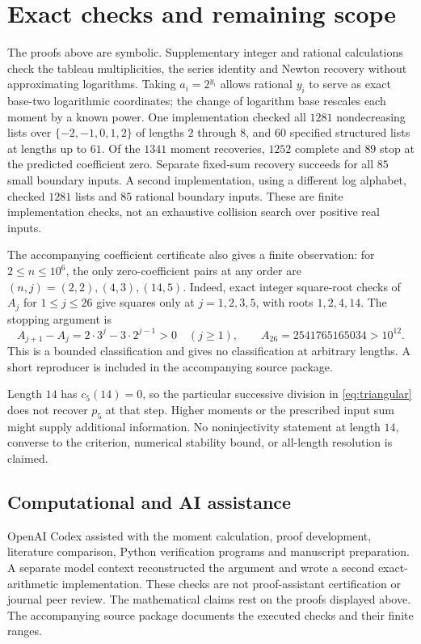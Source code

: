 \documentclass[11pt]{amsart}
\theoremstyle{remark}
\begin{document}
\section{Exact checks and remaining scope}

The proofs above are symbolic. Supplementary integer and rational
calculations check the tableau multiplicities, the series identity and
Newton recovery without approximating logarithms. Taking $a_i=2^{y_i}$
allows rational $y_i$ to serve as exact base-two logarithmic coordinates;
the change of logarithm base rescales each moment by a known power.
One implementation checked all $1281$ nondecreasing lists over
$\{-2,-1,0,1,2\}$ of lengths $2$ through $8$, and $60$ specified
structured lists at lengths up to $61$. Of the $1341$ moment recoveries,
$1252$ complete and $89$ stop at the predicted coefficient zero.
Separate fixed-sum recovery succeeds for all $85$ small boundary inputs.
A second implementation, using a different log alphabet, checked $1281$
lists and $85$ rational boundary inputs. These are finite implementation
checks, not an exhaustive collision search over positive real inputs.

The accompanying coefficient certificate also gives a finite observation:
for $2\leq n\leq10^6$, the only zero-coefficient pairs at any order are
$(n,j)=(2,2),(4,3),(14,5)$. Indeed, exact integer square-root checks
of $A_j$ for $1\leq j\leq26$ give squares only at $j=1,2,3,5$,
with roots $1,2,4,14$. The stopping argument is
\[
 A_{j+1}-A_j=2\cdot3^j-3\cdot2^{j-1}>0\quad(j\geq1),
 \qquad A_{26}=2541765165034>10^{12}.
\]
This is a bounded classification and gives no classification at arbitrary
lengths. A short reproducer is included in the accompanying source package.

Length $14$ has $c_5(14)=0$, so the particular successive division in
\eqref{eq:triangular} does not recover $p_5$ at that step. Higher moments
or the prescribed input sum might supply additional information. No
noninjectivity statement at length $14$, converse to the criterion,
numerical stability bound, or all-length resolution is claimed.

\subsection*{Computational and AI assistance}
OpenAI Codex assisted with the moment calculation, proof development,
literature comparison, Python verification programs and manuscript
preparation. A separate model context reconstructed the argument and
wrote a second exact-arithmetic implementation. These checks are not
proof-assistant certification or journal peer review. The mathematical
claims rest on the proofs displayed above. The accompanying source
package documents the executed checks and their finite ranges.



\end{document}
